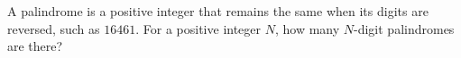 A palindrome is a positive integer that remains the same when its digits are reversed, such as $16461$. For a positive integer $N$, how many $N$-digit palindromes are there?
